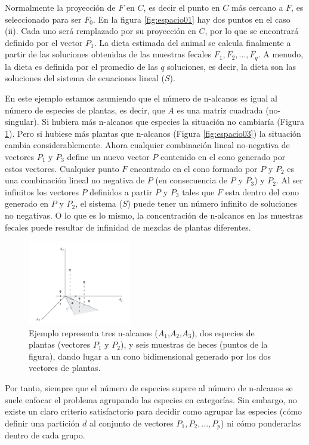 \documentclass[11pt]{article}
\begin{document}
Normalmente la proyección de $F$ en $C$, es decir el punto en $C$ más cercano a $F$, es seleccionado para ser $F_0$. En la figura \ref{fig:espacio01} hay dos puntos en el caso (ii). Cada uno será remplazado por su proyección en $C$, por lo que se encontrará definido por el vector $P_1$.
La dieta estimada del animal se calcula finalmente a partir de las soluciones obtenidas de las muestras fecales $F_1,F_2,...,F_q$.
A menudo, la dieta es definida por el promedio de las $q$ soluciones, es decir, la dieta son las soluciones del sistema de ecuaciones lineal ($S$).

En este ejemplo estamos asumiendo que el número de n-alcanos es igual al número de especies de plantas, es decir, que $A$ es una matriz cuadrada (no-singular). Si hubiera más n-alcanos que especies la situación no cambiaría (Figura \ref{fig:espacio02}). Pero si hubiese más plantas que n-alcanos (Figura \ref{fig:espacio03}) la situación cambia considerablemente. Ahora cualquier combinación lineal no-negativa de vectores $P_1$ y $P_3$ define un nuevo vector $P$ contenido en el cono generado por estos vectores. Cualquier punto $F$ encontrado en el cono formado por $P$ y $P_2$ es una combinación lineal no negativa de $P$ (en consecuencia de $P$ y $P_3$) y $P_2$. Al ser infinitos los vectores $P$ definidos a partir $P$ y $P_3$ tales que $F$ esta dentro del cono generado en $P$ y $P_2$, el sistema ($S$) puede tener un número infinito de soluciones no negativas. O lo que es lo mismo, la concentración de n-alcanos en las muestras fecales puede resultar de infinidad de mezclas de plantas diferentes.

\begin{figure}[h!] 
\centering
    \includegraphics[width=0.4\textwidth]{espacio02.png}
\caption{Ejemplo representa tres n-alcanos ($A_1$,$A_2$,$A_3$), dos especies de plantas (vectores $P_1$ y $P_2$), y seis muestras de heces (puntos de la figura), dando lugar a un cono bidimensional generado por los dos vectores de plantas.}
\label{fig:espacio02}
\end{figure}

Por tanto, siempre que el número de especies supere al número de n-alcanos se suele enfocar el problema agrupando las especies en categorías. Sin embargo, no existe un claro criterio satisfactorio para decidir como agrupar las especies (cómo definir una partición $d$ al conjunto de vectores $P_1, P_2,...,P_p$) ni cómo ponderarlas dentro de cada grupo.
\end{document}
